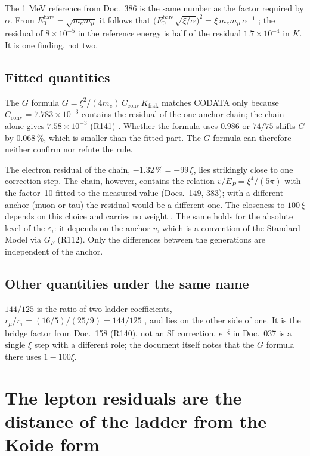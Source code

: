 The 1 MeV reference from Doc.~386 is the same number as the factor required by $\alpha$. From
$E_0^{\text{bare}}=\sqrt{m_em_\mu}$ it follows that $\bigl(E_0^{\text{bare}}\sqrt{\xi/\alpha}\bigr)^2=
\xi\,m_em_\mu\,\alpha^{-1}$ \BM; the residual of $8\times10^{-5}$ in the reference energy is half of
the residual $1.7\times10^{-4}$ in $K$. It is one finding, not two.

\subsection{Fitted quantities}

The $G$ formula $G=\xi^2/(4m_e)\,C_{\text{conv}}\,K_{\text{frak}}$ matches CODATA only because
$C_{\text{conv}}=7.783\times10^{-3}$ contains the residual of the one-anchor chain; the chain alone
gives $7.58\times10^{-3}$ (R141) \KM. Whether the formula uses $0.986$ or $74/75$ shifts $G$ by
$0.068\,\%$, which is smaller than the fitted part. The $G$ formula can therefore neither confirm nor
refute the rule.

The electron residual of the chain, $-1.32\,\%=-99\,\xi$, lies strikingly close to one correction
step. The chain, however, contains the relation $v/E_P=\xi^4/(5\pi)$ with the factor~10 fitted to the
measured value (Docs.~149, 383); with a different anchor (muon or tau) the residual would be a
different one. The closeness to $100\,\xi$ depends on this choice and carries no weight \SM. The same
holds for the absolute level of the $\varepsilon_i$: it depends on the anchor $v$, which is a
convention of the Standard Model via $G_F$ (R112). Only the differences between the generations are
independent of the anchor.

\subsection{Other quantities under the same name}

$144/125$ is the ratio of two ladder coefficients, $r_\mu/r_\tau=(16/5)/(25/9)=144/125$ \BM, and lies
on the other side of one. It is the bridge factor from Doc.~158 (R140), not an SI correction.
$e^{-\xi}$ in Doc.~037 is a single $\xi$ step with a different role; the document itself notes that
the $G$ formula there uses $1-100\xi$.

\section{The lepton residuals are the distance of the ladder from the Koide form}

